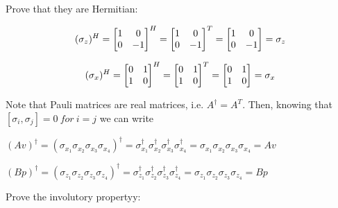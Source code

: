 \documentclass[12pt]{report}
\begin{document}
	
	\begin{minipage}{1 \textwidth}
			Prove that they are Hermitian:\newline
		
		\[
		\text{$( \sigma_z )^{H}$} = 
		\begin{bmatrix}
			1 & 0 \\
			0 & -1
		\end{bmatrix} ^H =
		\begin{bmatrix}
			1 & 0 \\
			0 & -1
		\end{bmatrix}^T =
		\begin{bmatrix}
			1 & 0 \\
			0 & -1
		\end{bmatrix}
		= \text{$ \sigma_z $}
		\]
		
		
		\[
		\text{$( \sigma_x )^{H}$} = 
		\begin{bmatrix}
			0 & 1 \\
			1 & 0
		\end{bmatrix} ^H =
		\begin{bmatrix}
			0 & 1 \\
			1 & 0
		\end{bmatrix}^T =
		\begin{bmatrix}
			0 & 1 \\
			1 & 0
		\end{bmatrix}
		= \text{$ \sigma_x $}
		\]\newline
		
		Note that Pauli matrices are real matrices, i.e. $A^{\dagger}=A^T$.
		Then, knowing that $[\sigma_i,\sigma_j]=0 \ for \ i=j$ we can write		\newline
		
		\begin{center}
			$(Av)^{\dagger} = (\sigma_{x_1} \sigma_{x_2} \sigma_{x_3} \sigma_{x_4})^{\dagger} = \sigma_{x_1}^{\dagger} \sigma_{x_2}^{\dagger} \sigma_{x_3}^{\dagger} \sigma_{x_4}^{\dagger} = \sigma_{x_1} \sigma_{x_2} \sigma_{x_3} \sigma_{x_4} = Av$ \newline
			
			$(Bp)^{\dagger} = (\sigma_{z_1} \sigma_{z_2} \sigma_{z_3} \sigma_{z_4})^{\dagger} = \sigma_{z_1}^{\dagger} \sigma_{z_2}^{\dagger} \sigma_{z_3}^{\dagger} \sigma_{z_4}^{\dagger} = \sigma_{z_1} \sigma_{z_2} \sigma_{z_3} \sigma_{z_4} = Bp$\newline
		\end{center}
		
		Prove the involutory propertyy:\newline
		

\end{minipage}
\end{document}
